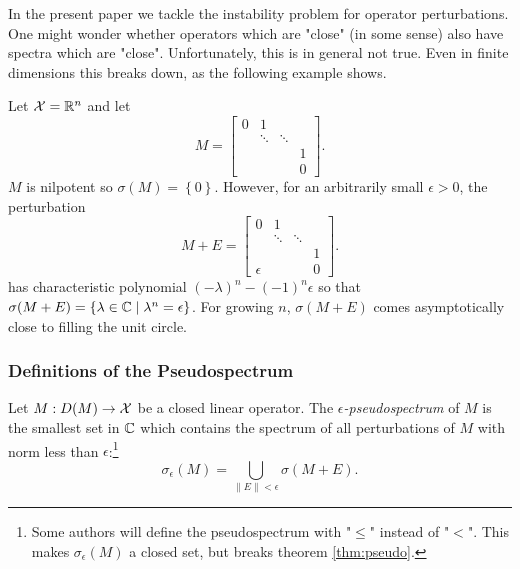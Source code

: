 In the present paper we tackle the instability problem for operator perturbations. 
One might wonder whether operators which are "close" (in some sense) also have spectra 
which are "close". Unfortunately, this is in general not true. Even in finite dimensions 
this breaks down, as the following example shows. 

\begin{example}
    \label{ex:spec_unstable}
    Let $\mathcal{X} = \mathbb{R}^n$ and let 
    \begin{equation}
        M = \begin{bmatrix}
            0 &   1    &        &   \\
              & \ddots & \ddots &   \\
              &        &        & 1 \\
              &        &        & 0
        \end{bmatrix} . 
    \end{equation}
    $M$ is nilpotent so $\sigma (M) = \left\{ 0 \right\}$. However, for an arbitrarily 
    small $\epsilon > 0$, the perturbation
    \begin{equation}
        M + E = \begin{bmatrix}
            0        &   1    &        &   \\
                        & \ddots & \ddots &   \\
                        &        &        & 1 \\
            \epsilon &        &        & 0
        \end{bmatrix} . 
    \end{equation}
    has characteristic polynomial $(-\lambda)^n - (-1)^n \epsilon$ so that 
    $\sigma (M + E) = \left\{ \lambda \in \mathbb{C} \mid \lambda^n = \epsilon \right\}$. 
    For growing $n$, $\sigma (M + E)$ comes asymptotically close to filling the 
    unit circle. 
\end{example}


\subsubsection{Definitions of the Pseudospectrum}

\begin{definition}
    Let $M : D(M) \to \mathcal{X}$ be a closed linear operator. The 
    \emph{$\epsilon$-pseudospectrum} of $M$ is 
    the smallest set in $\mathbb{C}$ which contains the spectrum of all perturbations of $M$ 
    with norm less than $\epsilon$:\footnote{
        Some authors will define the pseudospectrum with "$\leq$" instead of "$<$". This 
        makes $\sigma_\epsilon (M)$ a closed set, but breaks theorem \ref{thm:pseudo}.}
    \begin{equation}
        \label{eq:pseudospectrum_union}
        \sigma_\epsilon (M) = \bigcup_{\| E \| < \epsilon} \sigma (M + E). 
    \end{equation}
\end{definition}

